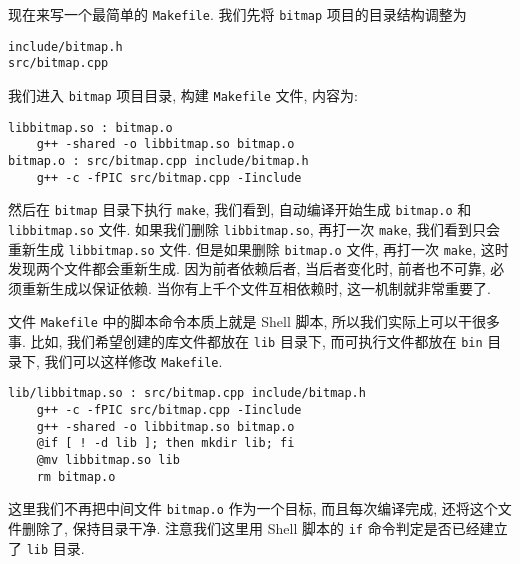 \documentclass[a4paper]{ctexart}
\begin{document}
现在来写一个最简单的 \verb|Makefile|. 我们先将 \verb|bitmap| 项目的目录结构调整为
\begin{verbatim}
include/bitmap.h
src/bitmap.cpp
\end{verbatim}

我们进入 \verb|bitmap| 项目目录, 构建 \verb|Makefile| 文件, 内容为:
\begin{verbatim}
libbitmap.so : bitmap.o
	g++ -shared -o libbitmap.so bitmap.o
bitmap.o : src/bitmap.cpp include/bitmap.h
	g++ -c -fPIC src/bitmap.cpp -Iinclude 
\end{verbatim}
然后在 \verb|bitmap| 目录下执行 \verb|make|, 我们看到, 自动编译开始生成 \verb|bitmap.o|
和 \verb|libbitmap.so| 文件. 如果我们删除 \verb|libbitmap.so|, 再打一次 \verb|make|,
我们看到只会重新生成 \verb|libbitmap.so| 文件. 但是如果删除 \verb|bitmap.o| 文件, 再打一次
\verb|make|, 这时发现两个文件都会重新生成. 因为前者依赖后者, 当后者变化时, 前者也不可靠,
必须重新生成以保证依赖. 当你有上千个文件互相依赖时, 这一机制就非常重要了.

文件 \verb|Makefile| 中的脚本命令本质上就是 Shell 脚本, 所以我们实际上可以干很多事. 比如,
我们希望创建的库文件都放在 \verb|lib| 目录下, 而可执行文件都放在 \verb|bin| 目录下,
我们可以这样修改 \verb|Makefile|.
\begin{verbatim}
lib/libbitmap.so : src/bitmap.cpp include/bitmap.h 
	g++ -c -fPIC src/bitmap.cpp -Iinclude 
	g++ -shared -o libbitmap.so bitmap.o
	@if [ ! -d lib ]; then mkdir lib; fi
	@mv libbitmap.so lib
	rm bitmap.o
\end{verbatim}

这里我们不再把中间文件 \verb|bitmap.o| 作为一个目标, 而且每次编译完成,
还将这个文件删除了, 保持目录干净. 注意我们这里用 Shell 脚本的 \verb|if|
命令判定是否已经建立了 \verb|lib| 目录.
\end{document}
